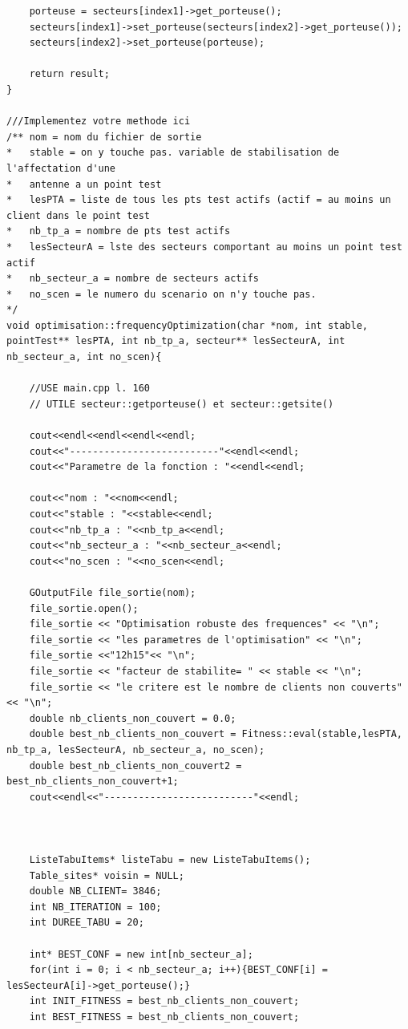 \documentclass[a4paper, 11pt]{report}
\begin{document}
\begin{appendices}
\begin{lstlisting}
    porteuse = secteurs[index1]->get_porteuse();
    secteurs[index1]->set_porteuse(secteurs[index2]->get_porteuse());
    secteurs[index2]->set_porteuse(porteuse);

    return result;
}

///Implementez votre methode ici
/** nom = nom du fichier de sortie
*   stable = on y touche pas. variable de stabilisation de l'affectation d'une
*   antenne a un point test
*   lesPTA = liste de tous les pts test actifs (actif = au moins un client dans le point test
*   nb_tp_a = nombre de pts test actifs
*   lesSecteurA = lste des secteurs comportant au moins un point test actif
*   nb_secteur_a = nombre de secteurs actifs
*   no_scen = le numero du scenario on n'y touche pas.
*/
void optimisation::frequencyOptimization(char *nom, int stable, pointTest** lesPTA, int nb_tp_a, secteur** lesSecteurA, int nb_secteur_a, int no_scen){

	//USE main.cpp l. 160
    // UTILE secteur::getporteuse() et secteur::getsite()

    cout<<endl<<endl<<endl<<endl;
    cout<<"--------------------------"<<endl<<endl;
    cout<<"Parametre de la fonction : "<<endl<<endl;

    cout<<"nom : "<<nom<<endl;
    cout<<"stable : "<<stable<<endl;
    cout<<"nb_tp_a : "<<nb_tp_a<<endl;
    cout<<"nb_secteur_a : "<<nb_secteur_a<<endl;
    cout<<"no_scen : "<<no_scen<<endl;

    GOutputFile file_sortie(nom);
	file_sortie.open();
    file_sortie << "Optimisation robuste des frequences" << "\n";
    file_sortie << "les parametres de l'optimisation" << "\n";
    file_sortie <<"12h15"<< "\n";
    file_sortie << "facteur de stabilite= " << stable << "\n";
    file_sortie << "le critere est le nombre de clients non couverts"<< "\n";
	double nb_clients_non_couvert = 0.0;
	double best_nb_clients_non_couvert = Fitness::eval(stable,lesPTA, nb_tp_a, lesSecteurA, nb_secteur_a, no_scen);
	double best_nb_clients_non_couvert2 = best_nb_clients_non_couvert+1;
    cout<<endl<<"--------------------------"<<endl;



    ListeTabuItems* listeTabu = new ListeTabuItems();
    Table_sites* voisin = NULL;
    double NB_CLIENT= 3846;
    int NB_ITERATION = 100;
    int DUREE_TABU = 20;

    int* BEST_CONF = new int[nb_secteur_a];
    for(int i = 0; i < nb_secteur_a; i++){BEST_CONF[i] = lesSecteurA[i]->get_porteuse();}
    int INIT_FITNESS = best_nb_clients_non_couvert;
    int BEST_FITNESS = best_nb_clients_non_couvert;


\end{lstlisting}
\end{appendices}
\end{document}
